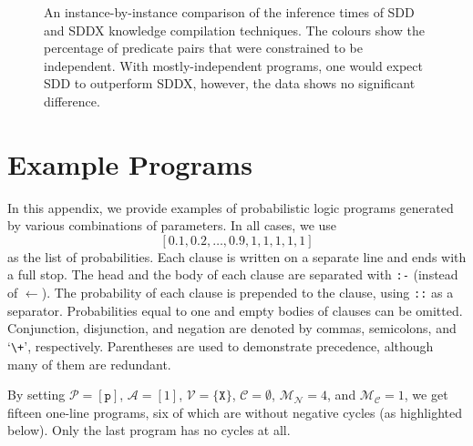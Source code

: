 \documentclass[runningheads]{llncs}
\newcommand{\predicates}{\mathcal{P}}
\newcommand{\variables}{\mathcal{V}}
\newcommand{\constants}{\mathcal{C}}
\newcommand{\arities}{\mathcal{A}}
\newcommand{\maxNumNodes}{\mathcal{M}_{\mathcal{N}}}
\newcommand{\maxNumClauses}{\mathcal{M}_{\mathcal{C}}}
\begin{document}
\begin{figure}
  \centering
  
  \caption{An instance-by-instance comparison of the inference times of SDD and
    SDDX knowledge compilation techniques. The colours show the percentage of
    predicate pairs that were constrained to be independent. With
    mostly-independent programs, one would expect SDD to outperform SDDX,
    however, the data shows no significant difference.}
\end{figure}



\section{Example Programs}

In this appendix, we provide examples of probabilistic logic programs generated
by various combinations of parameters. In all cases, we use
\[
  [0.1, 0.2, \dots, 0.9, 1, 1, 1, 1, 1]
\]
as the list of probabilities. Each clause is written on a separate line and ends
with a full stop. The head and the body of each clause are separated with
\texttt{:-} (instead of $\gets$). The probability of each clause is prepended to
the clause, using \texttt{::} as a separator. Probabilities equal to one and
empty bodies of clauses can be omitted. Conjunction, disjunction, and negation
are denoted by commas, semicolons, and `\texttt{\textbackslash+}', respectively.
Parentheses are used to demonstrate precedence, although many of them are
redundant.

By setting $\predicates{} = [\texttt{p}]$, $\arities{} = [1]$, $\variables{} =
\{ \texttt{X} \}$, $\constants{} = \emptyset$, $\maxNumNodes{} = 4$, and
$\maxNumClauses{} = 1$, we get fifteen one-line programs, six of which are
without negative cycles (as highlighted below). Only the last program has no
cycles at all.
\end{document}
